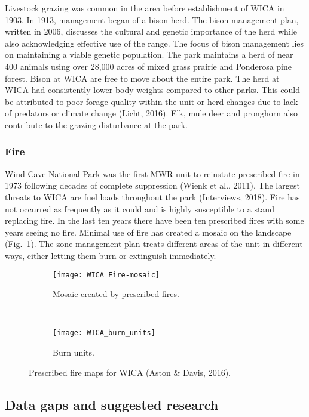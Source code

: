 Livestock grazing was common in the area before establishment of WICA in
1903. In 1913, management began of a bison herd. The bison management
plan, written in 2006, discusses the cultural and genetic importance of
the herd while also acknowledging effective use of the range. The focus
of bison management lies on maintaining a viable genetic population. The
park maintains a herd of near 400 animals using over 28,000 acres of
mixed grass prairie and Ponderosa pine forest. Bison at WICA are free to
move about the entire park. The herd at WICA had consistently lower body
weights compared to other parks. This could be attributed to poor forage
quality within the unit or herd changes due to lack of predators or
climate change (Licht, 2016). Elk, mule deer and pronghorn also
contribute to the grazing disturbance at the park.

\subsubsection{Fire }

Wind Cave National Park was the first MWR unit to reinstate prescribed
fire in 1973 following decades of complete suppression (Wienk et al.,
2011). The largest threats to WICA are fuel loads throughout the park
(Interviews, 2018). Fire has not occurred as frequently as it could and
is highly susceptible to a stand replacing fire. In the last ten years
there have been ten prescribed fires with some years seeing no fire.
Minimal use of fire has created a mosaic on the landscape (Fig.~\ref{fig:WICAmosaic}).
The zone management plan treats different areas of the unit in different
ways, either letting them burn or extinguish immediately.

\begin{figure}[]
	\centering
	\begin{subfigure}[t]{0.5\textwidth}
		\centering
		\texttt{[image: WICA\_Fire-mosaic]}
		\caption{Mosaic created by prescribed fires.}
		\label{fig:WICAmosaic}
	\end{subfigure}%
	~ 
	\begin{subfigure}[t]{0.5\textwidth}
		\centering
		\texttt{[image: WICA\_burn\_units]}
		\caption{Burn units.}
		\label{fig:WICAunits}
	\end{subfigure}
	\caption[WICA fire maps]{Prescribed fire maps for WICA (Aston \& Davis,
		2016).}
\end{figure}

\subsection{Data gaps and suggested research}

